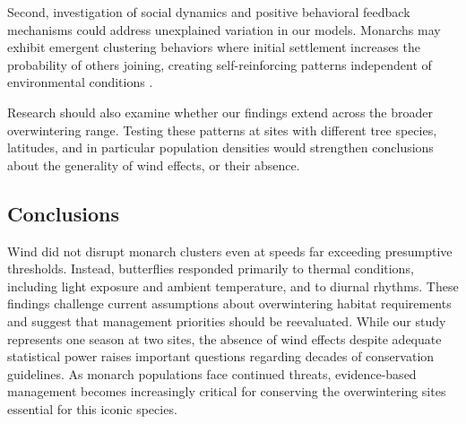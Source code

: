 Second, investigation of social dynamics and positive behavioral feedback mechanisms could address unexplained variation in our models. Monarchs may exhibit emergent clustering behaviors where initial settlement increases the probability of others joining, creating self-reinforcing patterns independent of environmental conditions \citep{berdahlEmergentSensingComplex2013}.

Research should also examine whether our findings extend across the broader overwintering range. Testing these patterns at sites with different tree species, latitudes, and in particular population densities would strengthen conclusions about the generality of wind effects, or their absence.

\subsection{Conclusions}

Wind did not disrupt monarch clusters even at speeds far exceeding presumptive thresholds. Instead, butterflies responded primarily to thermal conditions, including light exposure and ambient temperature, and to diurnal rhythms. These findings challenge current assumptions about overwintering habitat requirements and suggest that management priorities should be reevaluated. While our study represents one season at two sites, the absence of wind effects despite adequate statistical power raises important questions regarding decades of conservation guidelines. As monarch populations face continued threats, evidence-based management becomes increasingly critical for conserving the overwintering sites essential for this iconic species.